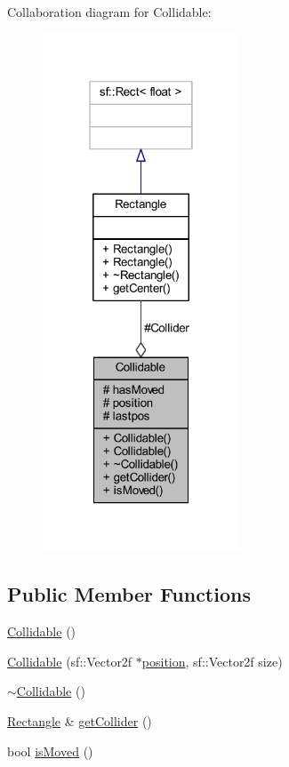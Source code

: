 Collaboration diagram for Collidable\-:\nopagebreak
\begin{figure}[H]
\begin{center}
\leavevmode
\includegraphics[width=166pt]{class_collidable__coll__graph}
\end{center}
\end{figure}
\subsection*{Public Member Functions}
\begin{DoxyCompactItemize}
\item 
\hyperlink{class_collidable_a92ce9e2b08086bb2f466168ffc69c9ed}{Collidable} ()
\item 
\hyperlink{class_collidable_a71a242ba63c157ca40acbf4421c0eaf7}{Collidable} (sf\-::\-Vector2f $\ast$\hyperlink{class_collidable_aa6c2e113d920df8c0d5da2a244f924bd}{position}, sf\-::\-Vector2f size)
\item 
\hyperlink{class_collidable_a454ca1b66dd504b25fed3706914cee6e}{$\sim$\-Collidable} ()
\item 
\hyperlink{class_rectangle}{Rectangle} \& \hyperlink{class_collidable_ac9edfccd8c5a1ea77238c0a19aa910c3}{get\-Collider} ()
\item 
bool \hyperlink{class_collidable_a8cc1f09ce02e6fcf56d98f07f908a104}{is\-Moved} ()
\end{DoxyCompactItemize}
